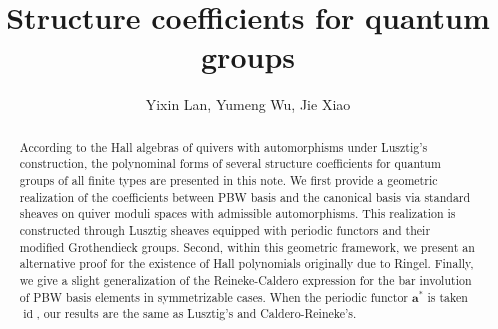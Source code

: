 \documentclass[10pt]{amsart}
\begin{document}
\title[]{Structure coefficients for quantum groups}


\author{Yixin Lan, Yumeng Wu, Jie Xiao}
\address{Max Plank institute for mathematics}
\address{Beijing International Center for Mathematical Research, Beijing 100871, P. R. China}
\address{School of mathematical seciences, Beijing Normal University, Beijing 100875, P. R. China}





\keywords{}


\begin{abstract}
According to the Hall algebras of quivers with automorphisms under Lusztig's construction, the polynominal forms of several structure coefficients for quantum groups of all finite types are presented in this note. We first provide a geometric realization of the coefficients between PBW basis and the canonical basis via standard sheaves on quiver moduli spaces with admissible automorphisms. This realization is constructed through Lusztig sheaves equipped with periodic functors and their modified Grothendieck groups. Second, within this geometric framework, we present an alternative proof for  the existence of Hall polynomials originally due to Ringel. Finally, we give a slight generalization of the Reineke-Caldero expression for the bar involution of PBW basis elements in symmetrizable cases. When the periodic functor $\mathbf{a}^*$ is taken $\operatorname{id}$, our results are the same as Lusztig's and Caldero-Reineke's.

\end{abstract}
\maketitle
\setcounter{tocdepth}{1}\tableofcontents
\end{document}
